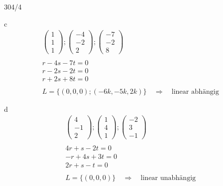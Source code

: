 \begin{exercise}{304/4}
  \item [c]
  \begin{gather*}
    \begin{pmatrix}1 \\ 1 \\ 1\end{pmatrix}; \begin{pmatrix}-4 \\ -2 \\ 2\end{pmatrix}; \begin{pmatrix}-7 \\ -2 \\ 8\end{pmatrix} \\\\
    r - 4s - 7t = 0 \\
    r - 2s - 2t = 0 \\
    r + 2s + 8t = 0 \\\\
    L = \{(0, 0, 0); (-6k, -5k, 2k)\} \quad\Rightarrow\quad \text{linear abhängig}
  \end{gather*}
  \item [d]
  \begin{gather*}
    \begin{pmatrix}4 \\ -1 \\ 2\end{pmatrix}; \begin{pmatrix}1 \\ 4 \\ 1\end{pmatrix}; \begin{pmatrix}-2 \\ 3 \\ -1\end{pmatrix} \\\\
    4r + s - 2t = 0 \\
    -r + 4s + 3t = 0 \\
    2r + s - t = 0 \\\\
    L = \{(0, 0, 0)\} \quad\Rightarrow\quad \text{linear unabhängig}
  \end{gather*}
\end{exercise}
